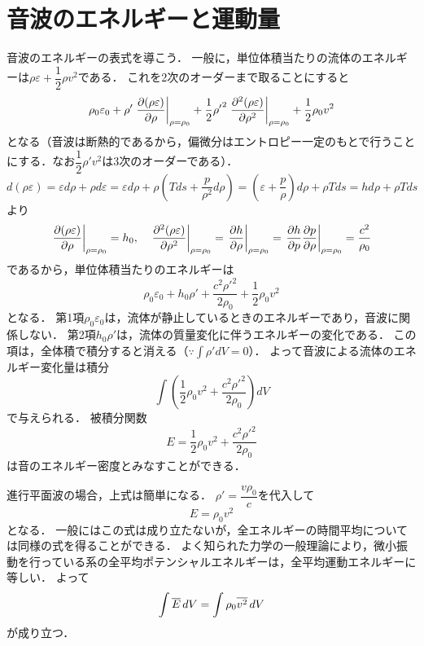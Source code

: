\section{音波のエネルギーと運動量}
\label{sec:65}

音波のエネルギーの表式を導こう．
一般に，単位体積当たりの流体のエネルギーは$\rho\varepsilon+\dfrac{1}{2}\rho v^2$である．
これを2次のオーダーまで取ることにすると
\[
    \rho_0\varepsilon_0 + \rho' \eval{\pdv{(\rho\varepsilon)}{\rho}}_{\rho=\rho_0} + \frac{1}{2} {\rho'}^2 \eval{\pdv[2]{(\rho\varepsilon)}{\rho}}_{\rho=\rho_0}
    +\frac{1}{2}\rho_0 v^2
\]
となる（音波は断熱的であるから，偏微分はエントロピー一定のもとで行うことにする．なお$\dfrac{1}{2}\rho' v^2$は3次のオーダーである）．
\[
    d(\rho\varepsilon) = \varepsilon d\rho + \rho d\varepsilon
    = \varepsilon d\rho + \rho\left(Tds+\frac{p}{\rho^2}d\rho\right)
    = \left( \varepsilon+\frac{p}{\rho} \right) d\rho + \rho T ds
    = h d\rho + \rho T ds
\]
より
\[
    \eval{\pdv{(\rho\varepsilon)}{\rho}}_{\rho=\rho_0} = h_0, \quad
    \eval{\pdv[2]{(\rho\varepsilon)}{\rho}}_{\rho=\rho_0} = \eval{\pdv{h}{\rho}}_{\rho=\rho_0}
    = \eval{\pdv{h}{p}\pdv{p}{\rho}}_{\rho=\rho_0} = \frac{c^2}{\rho_0}
\]
であるから，単位体積当たりのエネルギーは
\[
    \rho_0\varepsilon_0 + h_0 \rho' + \frac{c^2{\rho'}^2}{2\rho_0} + \frac{1}{2} \rho_0 v^2
\]
となる．
第1項$\rho_0\varepsilon_0$は，流体が静止しているときのエネルギーであり，音波に関係しない．
第2項$ h_0 \rho'$は，流体の質量変化に伴うエネルギーの変化である．
この項は，全体積で積分すると消える（$\because \int\rho' dV=0$）．
よって音波による流体のエネルギー変化量は積分
\[
    \int \left( \frac{1}{2} \rho_0 v^2 + \frac{c^2{\rho'}^2}{2\rho_0} \right) dV
\]
で与えられる．
被積分関数
\begin{equation}
    E = \frac{1}{2} \rho_0 v^2 + \frac{c^2{\rho'}^2}{2\rho_0}
\end{equation}
は音のエネルギー密度とみなすことができる．

進行平面波の場合，上式は簡単になる．
$\rho' = \dfrac{v \rho_0}{c}$を代入して
\begin{equation}
    E = \rho_0 v^2
\end{equation}
となる．
一般にはこの式は成り立たないが，全エネルギーの時間平均については同様の式を得ることができる．
よく知られた力学の一般理論により，微小振動を行っている系の全平均ポテンシャルエネルギーは，全平均運動エネルギーに等しい．
よって
\begin{equation}
    \int \overline{E} \, dV = \int \rho_0 \overline{v^2} \, dV
\end{equation}
が成り立つ．


